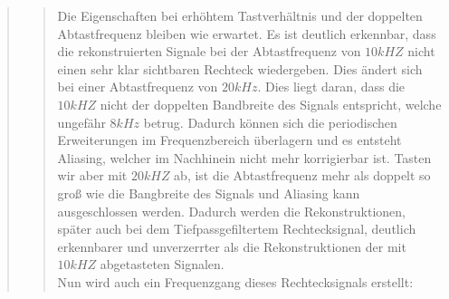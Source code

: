 \begin{quote}
\begin{quote}
      	    Die Eigenschaften bei erhöhtem Tastverhältnis und der doppelten
      	    Abtastfrequenz bleiben wie erwartet. Es ist deutlich erkennbar, dass
      	    die rekonstruierten Signale bei der Abtastfrequenz von $10 kHZ$ nicht
      	    einen sehr klar sichtbaren Rechteck wiedergeben. Dies ändert sich bei
      	    einer Abtastfrequenz von $20 kHz$. Dies liegt daran, dass die $10 kHZ$
      	    nicht der doppelten Bandbreite des Signals entspricht, welche ungefähr
      	    $8 kHz$ betrug. Dadurch können sich die periodischen Erweiterungen
      	    im Frequenzbereich überlagern und es entsteht Aliasing, welcher im
      	    Nachhinein nicht mehr korrigierbar ist. Tasten wir aber mit $20 kHZ$
      	    ab, ist die Abtastfrequenz mehr als doppelt so groß wie die Bangbreite
      	    des Signals und Aliasing kann ausgeschlossen werden. Dadurch werden die
      	    Rekonstruktionen, später auch bei dem Tiefpassgefiltertem
      	    Rechtecksignal, deutlich erkennbarer und unverzerrter als die
      	    Rekonstruktionen der mit $10 kHZ$ abgetasteten Signalen.\\
      	    
      	    Nun wird auch ein Frequenzgang dieses Rechtecksignals erstellt:
        	

\end{quote}
\end{quote}
